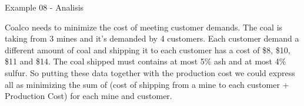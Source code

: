 \begin{frame}{Example 08 - Analisis}

Coalco needs to minimize the cost of meeting customer demands.  The coal
is taking from 3 mines and it's demanded by 4 customers.  Each customer
demand a different amount of coal and shipping it to each customer has a cost
of \$8, \$10, \$11 and \$14. The coal shipped must contains at most 5\% ash
and at most 4\% sulfur.  So putting these data together with the production
cost we could express all as minimizing the sum of
(cost of shipping from a mine to each customer + Production Cost) for each
mine and customer.
\end{frame}
